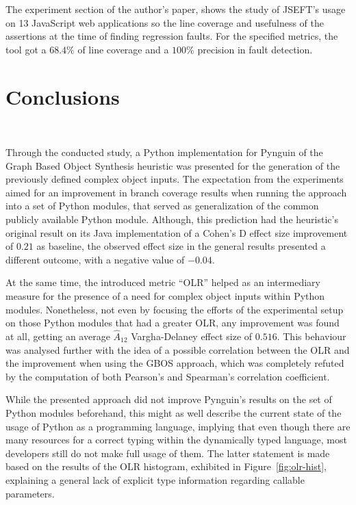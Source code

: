\documentclass[%
  chapterprefix=false,%
  open=right,%
  twoside=true,%
  paper=a4,%
  logofile={Figures/logo.png},%
  thesistype=master,%
  UKenglish,%
]{se2thesis}
\begin{document}
The experiment section of the author's paper, shows the study of JSEFT's usage on 13 JavaScript web applications so the line coverage and usefulness of the assertions at the time of finding regression faults.
For the specified metrics, the tool got a \(68.4\%\) of line coverage and a \(100\%\) precision in fault detection.

\chapter{Conclusions}~\label{chap:conclusions}

Through the conducted study, a Python implementation for Pynguin of the Graph Based Object Synthesis heuristic was presented for the generation of the previously defined complex object inputs.
The expectation from the experiments aimed for an improvement in branch coverage results when running the approach into a set of Python modules, that served as generalization of the common publicly available Python module.
Although, this prediction had the heuristic's original result on its Java implementation of a Cohen's D effect size improvement of \(0.21\) as baseline, the observed effect size in the general results presented a different outcome, with a negative value of \(-0.04\).

At the same time, the introduced metric ``OLR'' helped as an intermediary measure for the presence of a need for complex object inputs within Python modules. 
Nonetheless, not even by focusing the efforts of the experimental setup on those Python modules that had a greater OLR, any improvement was found at all, getting an average \(\hat{A}_{12}\) Vargha-Delaney effect size of \(0.516\).
This behaviour was analysed further with the idea of a possible correlation between the OLR and the improvement when using the GBOS approach, which was completely refuted by the computation of both Pearson's and Spearman's correlation coefficient.

While the presented approach did not improve Pynguin's results on the set of Python modules beforehand, this might as well describe the current state of the usage of Python as a programming language, implying that even though there are many resources for a correct typing within the dynamically typed language, most developers still do not make full usage of them.
The latter statement is made based on the results of the OLR histogram, exhibited in Figure~\ref{fig:olr-hist}, explaining a general lack of explicit type information regarding callable parameters.
\end{document}
